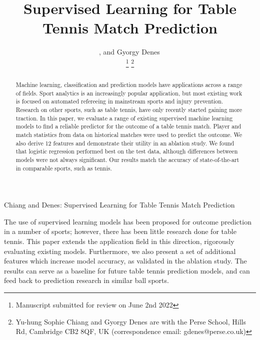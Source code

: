\documentclass[journal]{IEEEtai}
\begin{document}
\title{Supervised Learning for Table Tennis Match Prediction}
\author{, and
    Gyorgy Denes\,

\thanks{Manuscript submitted for review on  June 2nd 2022} 
\thanks{Yu-hung Sophie Chiang and Gyorgy Denes are with the Perse School, Hills Rd, Cambridge CB2 8QF, UK (correspondence email: gdenes@perse.co.uk)}
}

{Chiang and Denes: Supervised Learning for Table Tennis Match Prediction}



\maketitle


\begin{abstract}
Machine learning, classification and prediction models have applications across a range of fields. Sport analytics is an increasingly popular application, but most existing work is focused on automated refereeing in mainstream sports and injury prevention.
Research on other sports, such as table tennis, have only recently started gaining more traction. In this paper, we evaluate a range of existing supervised machine learning models to find a reliable predictor for the outcome of a table tennis match. Player and match statistics from data on historical matches were used to predict the outcome. We also derive 12 features and demonstrate their utility in an ablation study. We found that  logistic regression performed best on the test data, although differences between models were not always significant.  Our results match the accuracy of state-of-the-art in comparable sports, such as tennis.
\end{abstract}

\begin{IEEEImpStatement}
The use of supervised learning models has been proposed for outcome prediction in a number of sports; however, there has been little research done for table tennis. This paper extends the application field in this direction, rigorously evaluating existing models. Furthermore, we also present a set of additional features which increase model accuracy, as validated in the ablation study. The results can serve as a baseline for future table tennis prediction models, and can feed back to prediction research in similar ball sports.
\end{IEEEImpStatement}
\end{document}
